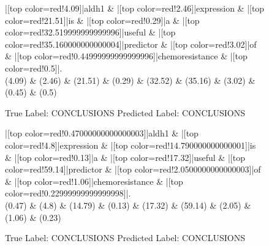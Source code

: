 \documentclass[a4paper, landscape]{article}
\begin{document}
\begin{figure}
\begin{center}
\begin{dependency}
\begin{deptext}
|[top color=red!4.09]|aldh1 \& |[top color=red!2.46]|expression \& |[top color=red!21.51]|is \& |[top color=red!0.29]|a \& |[top color=red!32.519999999999996]|useful \& |[top color=red!35.160000000000004]|predictor \& |[top color=red!3.02]|of \& |[top color=red!0.44999999999999996]|chemoresistance \& |[top color=red!0.5]|.\\
(4.09) \& (2.46) \& (21.51) \& (0.29) \& (32.52) \& (35.16) \& (3.02) \& (0.45) \& (0.5)\\
\end{deptext}
\end{dependency}
\end{center}
\caption{True Label: CONCLUSIONS Predicted Label: CONCLUSIONS}
\end{figure}
\clearpage
\begin{figure}
\begin{center}
\begin{dependency}
\begin{deptext}
|[top color=red!0.47000000000000003]|aldh1 \& |[top color=red!4.8]|expression \& |[top color=red!14.790000000000001]|is \& |[top color=red!0.13]|a \& |[top color=red!17.32]|useful \& |[top color=red!59.14]|predictor \& |[top color=red!2.0500000000000003]|of \& |[top color=red!1.06]|chemoresistance \& |[top color=red!0.22999999999999998]|.\\
(0.47) \& (4.8) \& (14.79) \& (0.13) \& (17.32) \& (59.14) \& (2.05) \& (1.06) \& (0.23)\\
\end{deptext}
\end{dependency}
\end{center}
\caption{True Label: CONCLUSIONS Predicted Label: CONCLUSIONS}
\end{figure}
\end{document}
